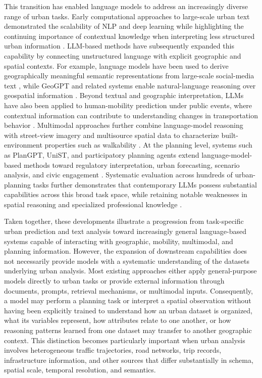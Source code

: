\documentclass[a4paper,fleqn]{cas-sc}
\begin{document}
This transition has enabled language models to address an increasingly diverse range of urban tasks. Early computational approaches to large-scale urban text demonstrated the scalability of NLP and deep learning while highlighting the continuing importance of contextual knowledge when interpreting less structured urban information \cite{lore2024hybrid}. LLM-based methods have subsequently expanded this capability by connecting unstructured language with explicit geographic and spatial contexts. For example, language models have been used to derive geographically meaningful semantic representations from large-scale social-media text \cite{berragan2024semantic}, while GeoGPT and related systems enable natural-language reasoning over geospatial information \cite{gao2024geogpt}. Beyond textual and geographic interpretation, LLMs have also been applied to human-mobility prediction under public events, where contextual information can contribute to understanding changes in transportation behavior \cite{liang2024mobility}. Multimodal approaches further combine language-model reasoning with street-view imagery and multisource spatial data to characterize built-environment properties such as walkability \cite{ki2025walkability}. At the planning level, systems such as PlanGPT, UniST, and participatory planning agents extend language-model-based methods toward regulatory interpretation, urban forecasting, scenario analysis, and civic engagement \cite{zhu2024plangpt,yuan2024unist,zhou2024participatory,lin2024urbangovernance}. Systematic evaluation across hundreds of urban-planning tasks further demonstrates that contemporary LLMs possess substantial capabilities across this broad task space, while retaining notable weaknesses in spatial reasoning and specialized professional knowledge \cite{zhao2025urbanplanning}.

Taken together, these developments illustrate a progression from task-specific urban prediction and text analysis toward increasingly general language-based systems capable of interacting with geographic, mobility, multimodal, and planning information. However, the expansion of downstream capabilities does not necessarily provide models with a systematic understanding of the datasets underlying urban analysis. Most existing approaches either apply general-purpose models directly to urban tasks or provide external information through documents, prompts, retrieval mechanisms, or multimodal inputs. Consequently, a model may perform a planning task or interpret a spatial observation without having been explicitly trained to understand how an urban dataset is organized, what its variables represent, how attributes relate to one another, or how reasoning patterns learned from one dataset may transfer to another geographic context. This distinction becomes particularly important when urban analysis involves heterogeneous traffic trajectories, road networks, trip records, infrastructure information, and other sources that differ substantially in schema, spatial scale, temporal resolution, and semantics.
\end{document}
